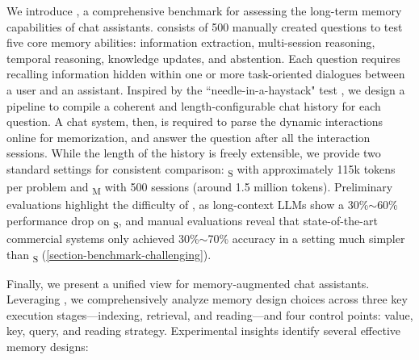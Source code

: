 We introduce \BENCHMARK, a comprehensive benchmark for assessing the long-term memory capabilities of chat assistants. \BENCHMARK{} consists of 500 manually created questions to test five core memory abilities: information extraction, multi-session reasoning, temporal reasoning, knowledge updates, and abstention. Each question requires recalling information hidden within one or more task-oriented dialogues between a user and an assistant. Inspired by the ``needle-in-a-haystack" test \citep{kamradt2023needle}, we design a pipeline to compile a coherent and length-configurable chat history for each question. A chat system, then, is required to parse the dynamic interactions online for memorization, and answer the question after all the interaction sessions. While the length of the history is freely extensible, we provide two standard settings for consistent comparison: \BENCHMARK\textsubscript{\textsc{S}} with approximately 115k tokens per problem and \BENCHMARK\textsubscript{\textsc{M}} with 500 sessions (around 1.5 million tokens). Preliminary evaluations highlight the difficulty of \BENCHMARK, as long-context LLMs show a 30\%$\sim$60\% performance drop on \BENCHMARK\textsubscript{\textsc{S}}, and manual evaluations reveal that state-of-the-art commercial systems only achieved 30\%$\sim$70\% accuracy in a setting much simpler than \BENCHMARK\textsubscript{\textsc{S}} (\cref{section-benchmark-challenging}).

Finally, we present a unified view for memory-augmented chat assistants. Leveraging \BENCHMARK, we comprehensively analyze memory design choices across three key execution stages—indexing, retrieval, and reading—and four control points: value, key, query, and reading strategy. Experimental insights identify several effective memory designs: 

